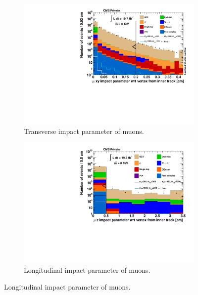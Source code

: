 \begin{figure}[!htbp]
  \ContinuedFloat
  \centering
  \begin{subfigure}[b]{0.495\textwidth}
    \centering
    \includegraphics[width=\textwidth]{plots/nMuon_d0Tk.pdf}
    \caption{Transverse impact parameter of muons.\label{fig:muo_d0}}
  \end{subfigure}
  \begin{subfigure}[b]{0.495\textwidth}
    \centering
    \includegraphics[width=\textwidth]{plots/nMuon_dzTk.pdf}
    \caption{Longitudinal impact parameter of muons.\label{fig:muo_dz}}
  \end{subfigure}
\end{figure}

